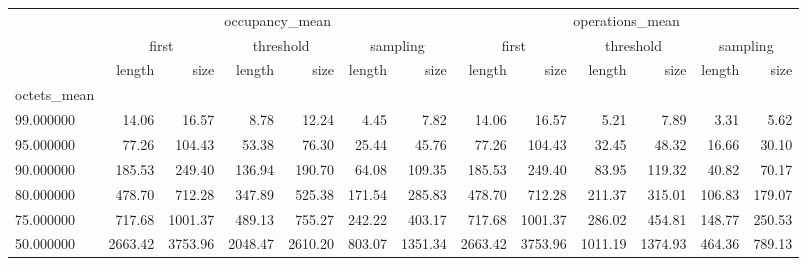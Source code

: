 \begin{tabular}{lrrrrrrrrrrrr}
\toprule
 & \multicolumn{6}{c}{occupancy_mean} & \multicolumn{6}{c}{operations_mean} \\
 & \multicolumn{2}{c}{first} & \multicolumn{2}{c}{threshold} & \multicolumn{2}{c}{sampling} & \multicolumn{2}{c}{first} & \multicolumn{2}{c}{threshold} & \multicolumn{2}{c}{sampling} \\
 & length & size & length & size & length & size & length & size & length & size & length & size \\
octets_mean &  &  &  &  &  &  &  &  &  &  &  &  \\
\midrule
99.000000 & 14.06 & 16.57 & 8.78 & 12.24 & 4.45 & 7.82 & 14.06 & 16.57 & 5.21 & 7.89 & 3.31 & 5.62 \\
95.000000 & 77.26 & 104.43 & 53.38 & 76.30 & 25.44 & 45.76 & 77.26 & 104.43 & 32.45 & 48.32 & 16.66 & 30.10 \\
90.000000 & 185.53 & 249.40 & 136.94 & 190.70 & 64.08 & 109.35 & 185.53 & 249.40 & 83.95 & 119.32 & 40.82 & 70.17 \\
80.000000 & 478.70 & 712.28 & 347.89 & 525.38 & 171.54 & 285.83 & 478.70 & 712.28 & 211.37 & 315.01 & 106.83 & 179.07 \\
75.000000 & 717.68 & 1001.37 & 489.13 & 755.27 & 242.22 & 403.17 & 717.68 & 1001.37 & 286.02 & 454.81 & 148.77 & 250.53 \\
50.000000 & 2663.42 & 3753.96 & 2048.47 & 2610.20 & 803.07 & 1351.34 & 2663.42 & 3753.96 & 1011.19 & 1374.93 & 464.36 & 789.13 \\
\bottomrule
\end{tabular}

